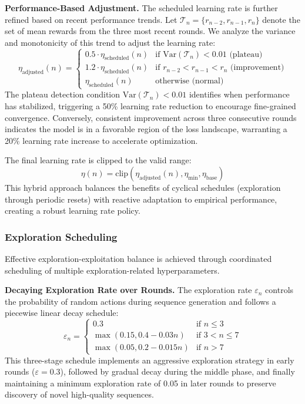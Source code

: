 \textbf{Performance-Based Adjustment.} The scheduled learning rate is further refined based on recent performance trends. Let $\mathcal{T}_n = \{r_{n-2}, r_{n-1}, r_n\}$ denote the set of mean rewards from the three most recent rounds. We analyze the variance and monotonicity of this trend to adjust the learning rate:
%
\begin{equation}
\eta_{\text{adjusted}}(n) = \begin{cases}
0.5 \cdot \eta_{\text{scheduled}}(n) & \text{if } \text{Var}(\mathcal{T}_n) < 0.01 \text{ (plateau)} \\
1.2 \cdot \eta_{\text{scheduled}}(n) & \text{if } r_{n-2} < r_{n-1} < r_n \text{ (improvement)} \\
\eta_{\text{scheduled}}(n) & \text{otherwise (normal)}
\end{cases}
\end{equation}
%
The plateau detection condition $\text{Var}(\mathcal{T}_n) < 0.01$ identifies when performance has stabilized, triggering a 50\% learning rate reduction to encourage fine-grained convergence. Conversely, consistent improvement across three consecutive rounds indicates the model is in a favorable region of the loss landscape, warranting a 20\% learning rate increase to accelerate optimization.

The final learning rate is clipped to the valid range:
%
\begin{equation}
\eta(n) = \text{clip}(\eta_{\text{adjusted}}(n), \eta_{\text{min}}, \eta_{\text{base}})
\end{equation}
%
This hybrid approach balances the benefits of cyclical schedules (exploration through periodic resets) with reactive adaptation to empirical performance, creating a robust learning rate policy.

\subsubsection{Exploration Scheduling}

Effective exploration-exploitation balance is achieved through coordinated scheduling of multiple exploration-related hyperparameters.

\textbf{Decaying Exploration Rate over Rounds.} The exploration rate $\varepsilon_n$ controls the probability of random actions during sequence generation and follows a piecewise linear decay schedule:
%
\begin{equation}
\varepsilon_n = \begin{cases}
0.3 & \text{if } n \leq 3 \\
\max(0.15, 0.4 - 0.03n) & \text{if } 3 < n \leq 7 \\
\max(0.05, 0.2 - 0.015n) & \text{if } n > 7
\end{cases}
\end{equation}
%
This three-stage schedule implements an aggressive exploration strategy in early rounds ($\varepsilon = 0.3$), followed by gradual decay during the middle phase, and finally maintaining a minimum exploration rate of 0.05 in later rounds to preserve discovery of novel high-quality sequences.

